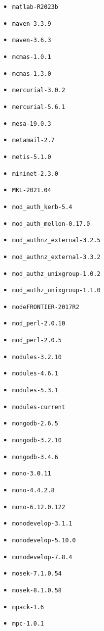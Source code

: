 \begin{multicols}{3}
\begin{itemize}
\item \verb|matlab-R2023b|
\item \verb|maven-3.3.9|
\item \verb|maven-3.6.3|
\item \verb|mcmas-1.0.1|
\item \verb|mcmas-1.3.0|
\item \verb|mercurial-3.0.2|
\item \verb|mercurial-5.6.1|
\item \verb|mesa-19.0.3|
\item \verb|metamail-2.7|
\item \verb|metis-5.1.0|
\item \verb|mininet-2.3.0|
\item \verb|MKL-2021.04|
\item \verb|mod_auth_kerb-5.4|
\item \verb|mod_auth_mellon-0.17.0|
\item \verb|mod_authnz_external-3.2.5|
\item \verb|mod_authnz_external-3.3.2|
\item \verb|mod_authz_unixgroup-1.0.2|
\item \verb|mod_authz_unixgroup-1.1.0|
\item \verb|modeFRONTIER-2017R2|
\item \verb|mod_perl-2.0.10|
\item \verb|mod_perl-2.0.5|
\item \verb|modules-3.2.10|
\item \verb|modules-4.6.1|
\item \verb|modules-5.3.1|
\item \verb|modules-current|
\item \verb|mongodb-2.6.5|
\item \verb|mongodb-3.2.10|
\item \verb|mongodb-3.4.6|
\item \verb|mono-3.0.11|
\item \verb|mono-4.4.2.8|
\item \verb|mono-6.12.0.122|
\item \verb|monodevelop-3.1.1|
\item \verb|monodevelop-5.10.0|
\item \verb|monodevelop-7.8.4|
\item \verb|mosek-7.1.0.54|
\item \verb|mosek-8.1.0.58|
\item \verb|mpack-1.6|
\item \verb|mpc-1.0.1|

\end{itemize}
\end{multicols}
